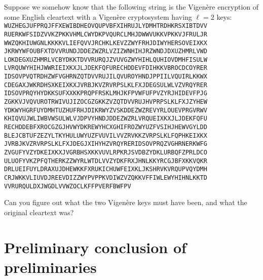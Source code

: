\documentclass[12pt,letterpaper]{amsbook}
\theoremstyle{definition}
\theoremstyle{remark}
\numberwithin{figure}{section}
\numberwithin{exercise}{chapter}
\numberwithin{section}{chapter}
\numberwithin{equation}{section}
\numberwithin{table}{subsection}
\begin{document}
\begin{BTtcb}[label=bt:crack_vigenere_example]{}{}
 Suppose we somehow know that the following string is the Vigen\`ere encryption
 of some English cleartext with a Vigen\`ere cryptosystem having $\ell=2$
 keys:\\
 {\tt WUZHEGJUFPRQJFFXEWIBDHEOVQUPVBFXIHRUJLYDMHTRDHKRSXIBTDVV\\
      RUERKWFSIDZVVKZPKKVHMLCWYDKPVQURCLMHJDWWVUKKVPKKVJFRULJR\\
      WWZQKHIUWGNLKKKKVLIEFQVVJRCHKLKEVZZWYFRHJDIWYHERSOVEIXKX\\
      JKRWYWFOUBFXTDVVRUNDJDDEZWZRLVZIZWNHIHJRZWNDJDXUZHMRLVWD\\
      LOKDEGXUZHMRLVCBYDKKTDVVRURQJZVUVGZWYHIHLQUHIOVDMHFISULW\\
      LVRQUWYHIHJWWRIEIXKXJLJDEKFQFURECHDDEVFDIHKKVBROCDCOYRER\\
      IDSOVPVQTRDHZWFVGHRNZQTDVVRUJILQVUROYHNDJPPIILVQUIRLKKWX\\
      CDEGAXJWKRDHSXKEIXKXJVRBJKVZRVRPSLKLFXJDEGSULWLVZVRQYRER\\
      IDSOVPRQYHYDKKSUFXXKKPRQPFRSKLMHJKFPVWFUFPVZYRJHIDEVFPJG\\
      ZGKKVJVQVUROTRWIVUJIZOCGZGKKZVZQTDVVRUJHVPRPSLKLFXJZYHEW\\
      YDKWYHGRFUYDMHTUZHUFRHJDIKRWYZVSKDDEZWZREVYRLOUEVPRGVRWV\\
      KHIQVUJWLIWBVWSULWLVJDPVYHNDJDDEZWZRLVRQUEIXKXJLJDEKFQFU\\
      RECHDDEBFXROCGZGJHVWYDKREWYHCXGHIFROZWYUZFVSIHJHEWVGYLDD\\
      BLEJCBTUFZEZYLTKYHULUWYUZFVUVILVVZRVKKZVRPSLKLFQPHKEIXKX\\
      JVRBJKVZRVRPSLKLFXJDEGJXIHYHZVRQYRERIDSOVPRQZVGHRNERKWFG\\
      ZVGUFYVZYDKEIXKXJVGRBHSXKKVUVLRPKRJSVDBZYDKLURBQFZPRLDCO\\
      ULUOFYVKZPFQTHERKZZWYRLWTDLVVZYDKFRXJHNLKKYRCGJBFXKKVQKR\\
      DRLUEIFUYLDRAXUJDHEWKKFXRUKICHUWFEIXKLJKSHRVKVRQUPVQYDMH\\
      CRJWKKVLIUVDJREEVDIZZWYPVPPKVDIWZVZQKKVFFIWLEWYHIHNLKKTD\\
      VVRURQULDXJWGDLVVWZOCLKFFPVERFBWFPV}

 Can you figure out what the two Vigen\`ere keys must have been, and what
 the original cleartext was?
\end{BTtcb}

\vfill
\pagebreak
\section{Preliminary conclusion of preliminaries} 
\label{sec:Pcop}
\end{document}
